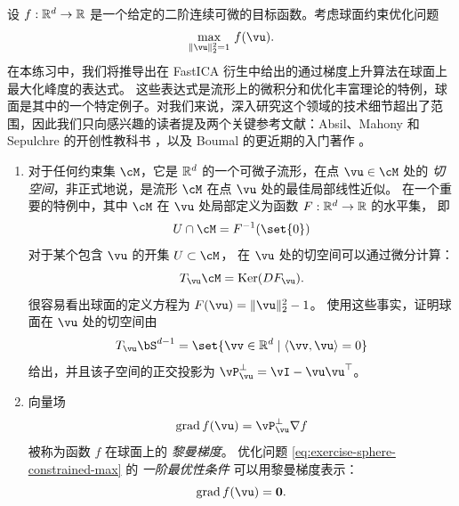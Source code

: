 \documentclass[../../book-main.tex]{subfiles}
\begin{document}
\begin{exercise}\label{exercise:sphere-calculus}
    设 $f : \mathbb{R}^d \to \mathbb{R}$ 是一个给定的二阶连续可微的目标函数。考虑球面约束优化问题
    \begin{equation}\label{eq:exercise-sphere-constrained-max}
        \max_{\norm{\vu}_2^2 = 1}\, f(\vu). 
    \end{equation}
    在本练习中，我们将推导出在 FastICA 衍生中给出的通过梯度上升算法在球面上最大化峰度的表达式。
    这些表达式是流形上的微积分和优化丰富理论的特例，球面是其中的一个特定例子。对我们来说，深入研究这个领域的技术细节超出了范围，因此我们只向感兴趣的读者提及两个关键参考文献：Absil、Mahony 和 Sepulchre 的开创性教科书
    \cite{Absil2009-nc}，以及 Boumal 的更近期的入门著作 \cite{Boumal2023-rj}。
    \begin{enumerate}
        \item 对于任何约束集 $\cM$，它是 $\mathbb{R}^d$ 的一个可微子流形，在点 $\vu \in \cM$ 处的 \textit{切空间}，非正式地说，是流形 $\cM$ 在点 $\vu$ 处的最佳局部线性近似。
        在一个重要的特例中，其中 $\cM$ 在 $\vu$ 处局部定义为函数 $F : \mathbb{R}^d \to \mathbb{R}$ 的水平集，
        即
        \begin{equation*}
            U \cap \cM = F^{-1}(\set{0})
        \end{equation*}
        对于某个包含 $\vu$ 的开集 $U \subset \cM$，
        在 $\vu$ 处的切空间可以通过微分计算：
        \begin{equation*}
            T_{\vu} \cM = \Ker(DF_{\vu}).
        \end{equation*}
        很容易看出球面的定义方程为 $F(\vu) = \norm{\vu}_2^2 - 1$。
        使用这些事实，证明球面在 $\vu$ 处的切空间由
        \begin{equation*}
            T_{\vu} \bS^{d-1} = \set{\vv \in \R^d \given \ip{\vv}{\vu} = 0}
        \end{equation*}
        给出，并且该子空间的正交投影为 $\vP_{\vu}^\perp = \vI - \vu\vu^\top$。
        \item 向量场
        \begin{equation}\label{eq:exercise-riemann-grad-sphere}
        \mathrm{grad}\, f(\vu) = \vP_{\vu}^\perp \nabla f
        \end{equation}
        被称为函数 $f$ 在球面上的 \textit{黎曼梯度}。
        优化问题 \eqref{eq:exercise-sphere-constrained-max} 的 \textit{一阶最优性条件} 可以用黎曼梯度表示：
        \begin{equation*}
            \mathrm{grad}\, f(\vu) = \mathbf{0}.
        \end{equation*}

\end{enumerate}
\end{exercise}
\end{document}
